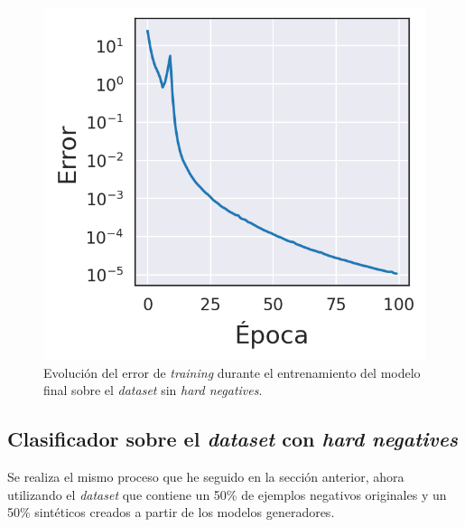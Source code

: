 \begin{figure}[H]
\centering
    \includegraphics[scale=0.67]{imagenes/image_classification/original_dataset/loss_final_model.png}
    \caption{Evolución del error de \textit{training} durante el entrenamiento del modelo final sobre el \textit{dataset} sin \textit{hard negatives}.}
    \label{fig:original-loss-final-model}
\end{figure}


\newpage
\subsection{Clasificador sobre el \textit{dataset} con \textit{hard negatives}}
Se realiza el mismo proceso que he seguido en la sección anterior, ahora utilizando el \textit{dataset} que contiene un 50\% de ejemplos negativos originales y un 50\% sintéticos creados a partir de los modelos generadores.

